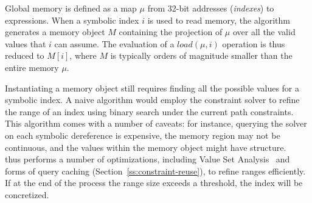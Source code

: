
Global memory is defined as a map $\mu$ from 32-bit addresses ({\em indexes}) to expressions. When a symbolic index $i$ is used to read memory, the algorithm generates a memory object $M$ containing the projection of $\mu$ over all the valid values that $i$ can assume. The evaluation of a $load(\mu,i)$ operation is thus reduced to $M[i]$, where $M$ is typically orders of magnitude smaller than the entire memory $\mu$.

Instantiating a memory object still requires finding all the possible values for a symbolic index. A naive algorithm would employ the constraint solver to refine the range of an index using binary search under the current path constraints. This algorithm comes with a number of caveats: for instance, querying the solver on each symbolic dereference is expensive, the memory region may not be continuous, and the values within the memory object might have structure. ~\cite{MAYHEM-SP12} thus performs a number of optimizations, including Value Set Analysis~\cite{VSA-CC04} and forms of query caching (Section~\ref{ss:constraint-reuse}), to refine ranges efficiently. If at the end of the process the range size exceeds a threshold, the index will be concretized. %

